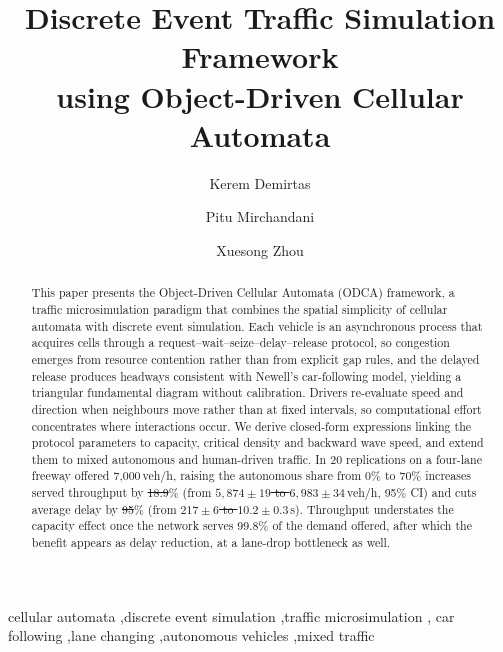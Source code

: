\documentclass[review,authoryear]{elsarticle}
\providecommand{\DIFaddtex}[1]{{\protect\color{blue}\uwave{#1}}} %
\providecommand{\DIFdeltex}[1]{{\protect\color{red}\sout{#1}}}                      %
\providecommand{\DIFaddbegin}{} %
\providecommand{\DIFaddend}{} %
\providecommand{\DIFdelbegin}{} %
\providecommand{\DIFdelend}{} %
\providecommand{\DIFadd}[1]{\texorpdfstring{\DIFaddtex{#1}}{#1}} %
\providecommand{\DIFdel}[1]{\texorpdfstring{\DIFdeltex{#1}}{}} %
\newcommand{\DIFscaledelfig}{0.5}
\newlength{\DIFdelgraphicswidth} %
\newlength{\DIFdelgraphicsheight} %
\newcommand{\DIFaddincludegraphics}[2][]{{\color{blue}\fbox{\DIFOincludegraphics[#1]{#2}}}} %
\newcommand{\DIFdelincludegraphics}[2][]{%
\sbox{\DIFdelgraphicsbox}{\DIFOincludegraphics[#1]{#2}}%
\settoboxwidth{\DIFdelgraphicswidth}{\DIFdelgraphicsbox} %
\settoboxtotalheight{\DIFdelgraphicsheight}{\DIFdelgraphicsbox} %
\scalebox{\DIFscaledelfig}{%
\parbox[b]{\DIFdelgraphicswidth}{\usebox{\DIFdelgraphicsbox}\\[-\baselineskip] \rule{\DIFdelgraphicswidth}{0em}}\llap{\resizebox{\DIFdelgraphicswidth}{\DIFdelgraphicsheight}{%
\setlength{\unitlength}{\DIFdelgraphicswidth}%
\begin{picture}(1,1)%
\thicklines\linethickness{2pt} %
{\color[rgb]{1,0,0}\put(0,0){\framebox(1,1){}}}%
{\color[rgb]{1,0,0}\put(0,0){\line( 1,1){1}}}%
{\color[rgb]{1,0,0}\put(0,1){\line(1,-1){1}}}%
\end{picture}%
}\hspace*{3pt}}} %
} %
\DeclareRobustCommand{\DIFaddbegin}{\DIFOaddbegin \let\includegraphics\DIFaddincludegraphics} %
\DeclareRobustCommand{\DIFaddend}{\DIFOaddend \let\includegraphics\DIFOincludegraphics} %
\DeclareRobustCommand{\DIFdelbegin}{\DIFOdelbegin \let\includegraphics\DIFdelincludegraphics} %
\DeclareRobustCommand{\DIFdelend}{\DIFOaddend \let\includegraphics\DIFOincludegraphics} %
\begin{document}
\begin{frontmatter}

\title{Discrete Event Traffic Simulation Framework\\using Object-Driven Cellular Automata}

\author[asu]{Kerem Demirtas}
\author[asu]{Pitu Mirchandani}
\author[ssebe]{Xuesong Zhou}


\begin{abstract}
This paper presents the Object-Driven Cellular Automata (ODCA) framework, a traffic microsimulation paradigm that combines the spatial simplicity of cellular automata with discrete event simulation. Each vehicle is an asynchronous process that acquires cells through a request--wait--seize--delay--release protocol, so congestion emerges from resource contention rather than from explicit gap rules, and the delayed release produces headways consistent with Newell's car-following model, yielding a triangular fundamental diagram without calibration. Drivers re-evaluate speed and direction when neighbours move rather than at fixed intervals, so computational effort concentrates where interactions occur. We derive closed-form expressions linking the protocol parameters to capacity, critical density and backward wave speed, and extend them to mixed autonomous and human-driven traffic. In 20 replications on a four-lane freeway offered 7{,}000\,veh/h, raising the autonomous share from 0\% to 70\% increases served throughput by \DIFdelbegin \DIFdel{18.9}\DIFdelend \DIFaddbegin \DIFadd{18.6}\DIFaddend \% (from \DIFdelbegin \DIFdel{$5{,}874 \pm 19$ to $6{,}983 \pm 34$}\DIFdelend \DIFaddbegin \DIFadd{$5{,}891 \pm 18$ to $6{,}984 \pm 35$}\DIFaddend \,veh/h, 95\% CI) and cuts average delay by \DIFdelbegin \DIFdel{95}\DIFdelend \DIFaddbegin \DIFadd{96}\DIFaddend \% (from \DIFdelbegin \DIFdel{$217 \pm 6$ to $10.2 \pm 0.3$}\DIFdelend \DIFaddbegin \DIFadd{$215 \pm 5$ to $8.7 \pm 0.2$}\DIFaddend \,s). Throughput understates the capacity effect once the network serves 99.8\% of the demand offered, after which the benefit appears as delay reduction, at a lane-drop bottleneck as well.
\end{abstract}

\begin{keyword}
cellular automata \sep discrete event simulation \sep traffic microsimulation \sep
car following \sep lane changing \sep autonomous vehicles \sep mixed traffic
\end{keyword}

\end{frontmatter}
\end{document}
